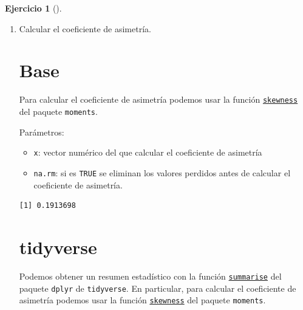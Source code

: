 \documentclass[
  spanish,
  a4paper,
]{scrreport}
\newenvironment{Shaded}{\begin{snugshade}}{\end{snugshade}}
\newcommand{\AttributeTok}[1]{\textcolor[rgb]{0.40,0.45,0.13}{#1}}
\newcommand{\ConstantTok}[1]{\textcolor[rgb]{0.56,0.35,0.01}{#1}}
\newcommand{\FunctionTok}[1]{\textcolor[rgb]{0.28,0.35,0.67}{#1}}
\newcommand{\NormalTok}[1]{\textcolor[rgb]{0.00,0.23,0.31}{#1}}
\newcommand{\SpecialCharTok}[1]{\textcolor[rgb]{0.37,0.37,0.37}{#1}}
\providecommand{\tightlist}{%
  \setlength{\itemsep}{0pt}\setlength{\parskip}{0pt}}
\theoremstyle{definition}
\newtheorem{exercise}{Ejercicio}[chapter]
\theoremstyle{remark}
\begin{document}
\begin{exercise}[]
\begin{enumerate}
\begin{tcolorbox}
  \end{tcolorbox}
\item
  Calcular el coeficiente de asimetría.

  \begin{tcolorbox}[enhanced jigsaw, colback=white, coltitle=black, toprule=.15mm, rightrule=.15mm, opacitybacktitle=0.6, opacityback=0, bottomtitle=1mm, toptitle=1mm, titlerule=0mm, breakable, leftrule=.75mm, title=\textcolor{quarto-callout-tip-color}{\faLightbulb}\hspace{0.5em}{Solución}, arc=.35mm, left=2mm, bottomrule=.15mm, colframe=quarto-callout-tip-color-frame, colbacktitle=quarto-callout-tip-color!10!white]

  \section{Base}

  Para calcular el coeficiente de asimetría podemos usar la función
  \href{https://www.rdocumentation.org/packages/moments/versions/0.14/topics/skewness}{\texttt{skewness}}
  del paquete \texttt{moments}.

  Parámetros:

  \begin{itemize}
  \tightlist
  \item
    \texttt{x}: vector numérico del que calcular el coeficiente de
    asimetría
  \item
    \texttt{na.rm}: si es \texttt{TRUE} se eliminan los valores perdidos
    antes de calcular el coeficiente de asimetría.
  \end{itemize}

\begin{Shaded}
\end{Shaded}

\begin{verbatim}
[1] 0.1913698
\end{verbatim}

  \section{tidyverse}

  Podemos obtener un resumen estadístico con la función
  \href{https://dplyr.tidyverse.org/reference/summarise.html}{\texttt{summarise}}
  del paquete \texttt{dplyr} de \texttt{tidyverse}. En particular, para
  calcular el coeficiente de asimetría podemos usar la función
  \href{https://www.rdocumentation.org/packages/moments/versions/0.14/topics/skewness}{\texttt{skewness}}
  del paquete \texttt{moments}.


\end{tcolorbox}
\end{enumerate}
\end{exercise}
\end{document}
